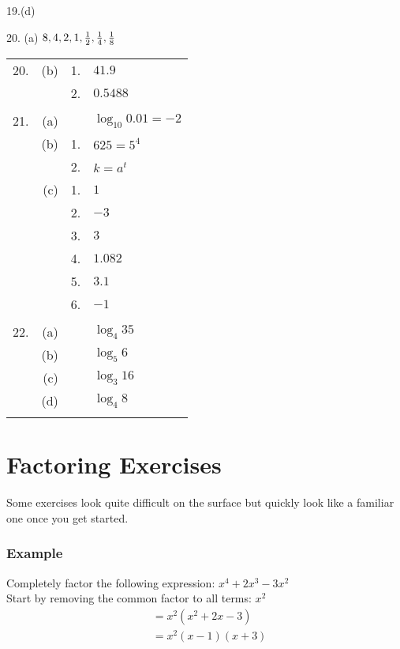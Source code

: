 19.(d)    
\setlength\fboxrule{0.01in}\setlength\fboxsep{0.2in}


20. (a) $8 ,4 ,2 ,1 ,\frac{1}{2} ,\frac{1}{4} ,\frac{1}{8}\vspace{+0.500000cm}$ \\\relax    
\setlength\fboxrule{0.01in}\setlength\fboxsep{0.2in}



\begin{tabular}[c]{rrrl}20.  & (b)
	& 1.  & $41.9$  \\
	&  & 2.
	& $0.5488$  \\
	&  &  &  \\
	21.
	& (a)  &  & $\log _{10} 0.01 = -2$  \\
	& (b)  & 1.
	& $625 =5^{4}$  \\
	&  & 2.
	& $k =a^{t}$  \\
	& (c)  & 1.
	& $1$  \\
	&  & 2.
	& $ -3$  \\
	&  & 3.
	& $3$  \\
	&  & 4.
	& $1.082$  \\
	&  & 5.
	& $3.1$  \\
	&  & 6.
	& $ -1$  \\
	&  &  &  \\
	22.
	& (a)  &  & $\log _{4} 35$  \\
	& (b)  &  & $\log _{5} 6$  \\
	& (c)  &  & $\log _{3} 16$  \\
	& (d)  &  & $\log _{4} 8$  \\
	&  &  &  \\

\end{tabular} 

\section{Factoring Exercises}
Some exercises look quite difficult on the surface but quickly look like a
familiar one once you get started. 

\subsubsection{Example}
Completely factor the following expression: $x^{4} +2 x^{3} -3 x^{2}$\\
Start by removing the common factor to all terms: $x^2$\\
\begin{eqnarray*}  &= x^{2} \left (x^{2} +2 x -3\right ) \\
	 &= x^{2} \left (x -1\right ) \left (x +3\right )\end{eqnarray*}


